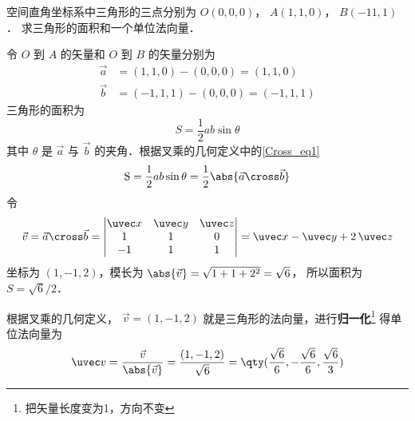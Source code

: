 \begin{exam}{}
空间直角坐标系中三角形的三点分别为 $O(0,0,0)$，  $A(1,1,0)$，  $B(-11,1)$． 求三角形的面积和一个单位法向量．

令 $O$ 到 $A$ 的矢量和  $O$ 到 $B$ 的矢量分别为
\begin{equation}\begin{aligned}
\vec a  &= (1,1,0) - (0,0,0) = (1,1,0)\\
\vec b  &= (-1,1,1) - (0,0,0) = (-1,1,1)
\end{aligned}\end{equation}
三角形的面积为
 \begin{equation}
{{S}} = \frac12 ab \sin \theta 
\end{equation}
其中 $\theta $ 是 $\vec a$ 与 $\vec b$ 的夹角．根据叉乘的几何定义中的\autoref{Cross_eq1}
\begin{equation}
{\rm{S}} = \frac 12 ab \sin \theta  = \frac 12 \abs{\vec a\cross\vec b}
\end{equation}
令
\begin{equation}
\vec v = \vec a \cross \vec b = 
\begin{vmatrix} {\uvec x}&{\uvec y}&{\uvec z}\\ 1&1&0\\-1&1&1 \end{vmatrix}
= \uvec x - \uvec y + 2\,\uvec z 
\end{equation}
坐标为 $(1,-1,2)$，模长为 $\abs{\vec v} = \sqrt {1 + 1 + {2^2}} = \sqrt 6$， 所以面积为 $S = \sqrt 6 /2$． 

根据叉乘的几何定义， $\vec v = (1,-1,2)$ 就是三角形的法向量，进行\textbf{归一化}\footnote{把矢量长度变为1，方向不变}
得单位法向量为
 \begin{equation}
\uvec v = \frac{\vec v}{\abs{\vec v}} = \frac{(1,-1,2)}{\sqrt 6 } = \qty( \frac{\sqrt 6 }{6}, - \frac{\sqrt 6 }{6}, \frac{\sqrt 6 }{3} )
\end{equation}
\end{exam}



